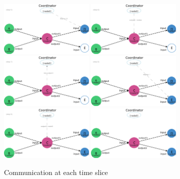 \begin{figure}[h]
    \includegraphics[width=0.4\textwidth]{figures/incdep_example_6}
    \includegraphics[width=0.4\textwidth]{figures/incdep_example_7}
    \includegraphics[width=0.4\textwidth]{figures/incdep_example_8}
    \includegraphics[width=0.4\textwidth]{figures/incdep_example_9}
    \includegraphics[width=0.4\textwidth]{figures/incdep_example_10}
    \includegraphics[width=0.4\textwidth]{figures/incdep_example_all}
	\caption{Communication at each time slice}	\label{fig:incdep_example_steps}
\end{figure}

